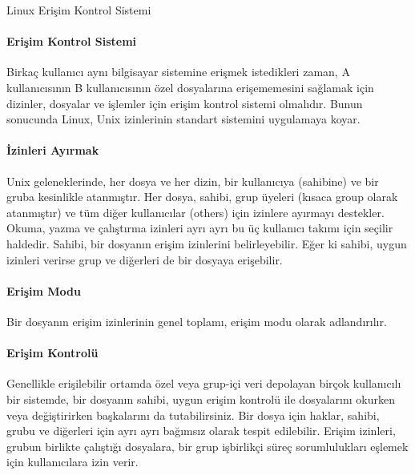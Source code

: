\begin{section}{Linux Erişim Kontrol Sistemi}
\paragraph{Erişim Kontrol Sistemi}{Birkaç kullanıcı aynı bilgisayar sistemine erişmek istedikleri zaman, A kullanıcısının B kullanıcısının özel dosyalarına erişememesini sağlamak için dizinler, dosyalar ve işlemler için erişim kontrol sistemi olmalıdır. Bunun sonucunda Linux, Unix izinlerinin standart sistemini uygulamaya koyar.}
\paragraph{İzinleri Ayırmak}{Unix geleneklerinde, her dosya ve her dizin, bir kullanıcıya (sahibine) ve bir gruba kesinlikle atanmıştır. Her dosya, sahibi, grup üyeleri (kısaca group olarak atanmıştır) ve tüm diğer kullanıcılar (others) için izinlere ayırmayı destekler. Okuma, yazma ve çalıştırma izinleri ayrı ayrı bu üç kullanıcı takımı için seçilir haldedir. Sahibi, bir dosyanın erişim izinlerini belirleyebilir. Eğer ki sahibi, uygun izinleri verirse grup ve diğerleri de bir dosyaya erişebilir.}
\paragraph{Erişim Modu}{Bir dosyanın erişim izinlerinin genel toplamı, erişim modu olarak adlandırılır.}
\paragraph{Erişim Kontrolü}{Genellikle erişilebilir ortamda özel veya grup-içi veri depolayan birçok kullanıcılı bir sistemde, bir dosyanın sahibi, uygun erişim kontrolü ile dosyalarını okurken veya değiştirirken başkalarını da tutabilirsiniz. Bir dosya için haklar, sahibi, grubu ve diğerleri için ayrı ayrı bağımsız olarak tespit edilebilir. Erişim izinleri, grubun birlikte çalıştığı dosyalara, bir grup işbirlikçi süreç sorumlulukları eşlemek için kullanıcılara izin verir.}
\end{section}
